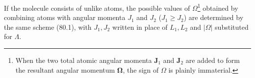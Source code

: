 If the molecule consists of unlike atoms, the possible values of $\Omega$\footnote{When the two total atomic angular momenta $\mathbf J_1$ and $\mathbf J_2$ are added to form the resultant angular momentum $\mathbf\Omega$, the sign of $\Omega$ is plainly immaterial.} obtained by combining atoms with angular momenta $J_1$ and $J_2$ ($J_1\geqslant J_2$) are determined by the same scheme (80.1), with $J_1,J_2$ written in place of $L_1,L_2$ and $|\Omega|$ substituted for $\Lambda$.

